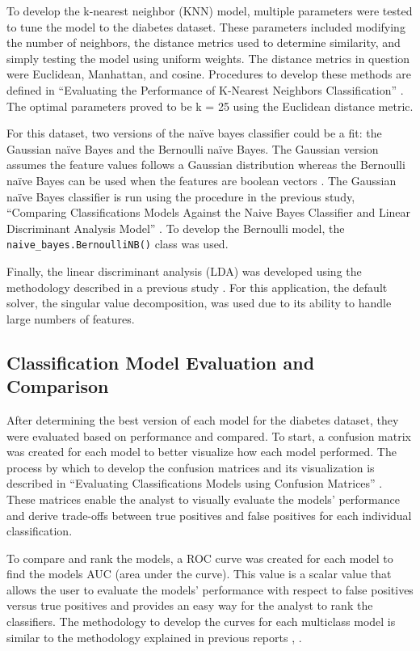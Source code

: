 \documentclass[journal]{IEEEtran}
\begin{document}
To develop the k-nearest neighbor (KNN) model, multiple parameters were tested to tune the model to the diabetes dataset. These parameters included modifying the number of neighbors, the distance metrics used to determine similarity, and simply testing the model using uniform weights. The distance metrics in question were Euclidean, Manhattan, and cosine. Procedures to develop these methods are defined in “Evaluating the Performance of K-Nearest Neighbors Classification” \cite{b7}. The optimal parameters proved to be k = 25 using the Euclidean distance metric.

For this dataset, two versions of the naïve bayes classifier could be a fit: the Gaussian naïve Bayes and the Bernoulli naïve Bayes. The Gaussian version assumes the feature values follows a Gaussian distribution whereas the Bernoulli naïve Bayes can be used when the features are boolean vectors \cite{b8}. The Gaussian naïve Bayes classifier is run using the procedure in the previous study,  “Comparing Classifications Models Against the Naive Bayes Classifier and Linear Discriminant Analysis Model” \cite{b9}. To develop the Bernoulli model, the \lstinline{naive_bayes.BernoulliNB()} class was used.

Finally, the linear discriminant analysis (LDA) was developed using the methodology described in a previous study \cite{b9}. For this application, the default solver, the singular value decomposition, was used due to its ability to handle large numbers of features. 

\subsection{Classification Model Evaluation and Comparison}

After determining the best version of each model for the diabetes dataset, they were evaluated based on performance and compared. To start, a confusion matrix was created for each model to better visualize how each model performed. The process by which to develop the confusion matrices and its visualization is described in “Evaluating Classifications Models using Confusion Matrices” \cite{b10}. These matrices enable the analyst to visually evaluate the models' performance and derive trade-offs between true positives and false positives for each individual classification.  

To compare and rank the models, a ROC curve was created for each model to find the models AUC (area under the curve). This value is a scalar value that allows the user to evaluate the models' performance with respect to false positives versus true positives and provides an easy way for the analyst to rank the classifiers. The methodology to develop the curves for each multiclass model is similar to the methodology explained in previous reports \cite{b9}, \cite{b11}. 
\end{document}
